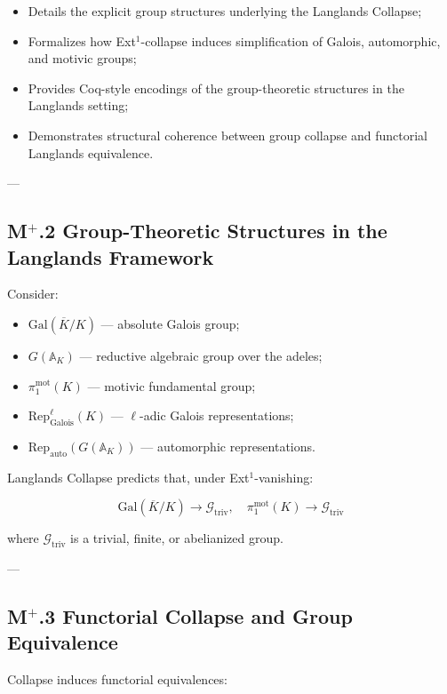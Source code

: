 \documentclass[11pt]{article}
\begin{document}
\begin{itemize}
    \item Details the explicit group structures underlying the Langlands Collapse;
    \item Formalizes how Ext$^1$-collapse induces simplification of Galois, automorphic, and motivic groups;
    \item Provides Coq-style encodings of the group-theoretic structures in the Langlands setting;
    \item Demonstrates structural coherence between group collapse and functorial Langlands equivalence.
\end{itemize}

---

\subsection*{M$^{+}$.2 Group-Theoretic Structures in the Langlands Framework}

Consider:

\begin{itemize}
    \item $\mathrm{Gal}(\overline{K}/K)$ — absolute Galois group;
    \item $G(\mathbb{A}_K)$ — reductive algebraic group over the adeles;
    \item $\pi_1^{\mathrm{mot}}(K)$ — motivic fundamental group;
    \item $\mathrm{Rep}_{\mathrm{Galois}}^\ell(K)$ — $\ell$-adic Galois representations;
    \item $\mathrm{Rep}_{\mathrm{auto}}(G(\mathbb{A}_K))$ — automorphic representations.
\end{itemize}

Langlands Collapse predicts that, under Ext$^1$-vanishing:

\[
\mathrm{Gal}(\overline{K}/K) \longrightarrow \mathcal{G}_{\mathrm{triv}}, \quad \pi_1^{\mathrm{mot}}(K) \longrightarrow \mathcal{G}_{\mathrm{triv}}
\]

where $\mathcal{G}_{\mathrm{triv}}$ is a trivial, finite, or abelianized group.

---

\subsection*{M$^{+}$.3 Functorial Collapse and Group Equivalence}

Collapse induces functorial equivalences:
\end{document}
